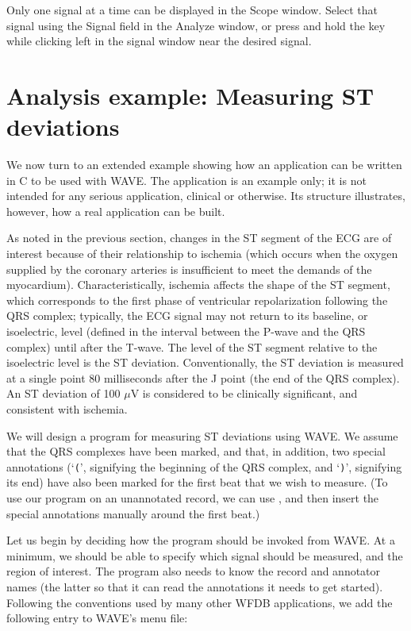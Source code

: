 \documentclass[twoside]{book}
\newcommand{\keycap}[1]{\cornersize{.5}\Ovalbox{\small\sf #1}}
\newcommand{\button}[1]{\cornersize{2}\ovalbox{\rule[-.3mm]{0cm}{2.5mm}\small\sf ~#1~}}
\newcommand{\WAVE}{{\sf WAVE}\xspace}
\begin{document}
Only one signal at a time can be displayed in the {\sf Scope} window.
Select that signal using the {\sf Signal} field in the {\sf Analyze}
window, or press and hold the \keycap{Shift} key while clicking left
in the signal window near the desired signal.

\section{Analysis example: Measuring ST deviations}

We now turn to an extended example showing how an
application can be written in C to be used with \WAVE{}.  The
application is an example only;  it is not intended for any serious
application, clinical or otherwise.  Its structure illustrates,
however, how a real application can be built.

As noted in the previous section, changes in the ST segment of the ECG
are of interest because of their relationship to ischemia
(which occurs when the oxygen supplied by the coronary arteries is
insufficient to meet the demands of the myocardium).
Characteristically, ischemia affects the shape of the ST segment, 
which corresponds to the first phase of ventricular repolarization
following the QRS complex;  typically, the ECG signal may not return 
to its baseline, or isoelectric, level (defined in the interval
between the P-wave and the QRS complex) until after the T-wave.  The
level of the ST segment relative to the isoelectric level is the ST
deviation.  Conventionally, the ST deviation is measured at a single
point 80 milliseconds after the J point (the end of the QRS complex).
An ST deviation of 100 $\mu$V is considered to be clinically
significant, and consistent with ischemia.

We will design a program for measuring ST deviations using \WAVE{}.  We
assume that the QRS complexes have been marked, and that, in addition,
two special annotations (`{\tt (}', signifying the beginning of the QRS
complex, and `{\tt )}', signifying its end) have also been marked for the
first beat that we wish to measure.  (To use our program on an
unannotated record, we can use \button{Mark QRS complexes}, and then
insert the special annotations manually around the first beat.)

Let us begin by deciding how the program should be invoked from \WAVE{}.
At a minimum, we should be able to specify which signal should be
measured, and the region of interest.
The program also needs to know the record and annotator names (the
latter so that it can read the annotations it needs to get started).
Following the conventions used by many other WFDB applications, we
add the following entry to \WAVE{}'s menu file:
\end{document}
